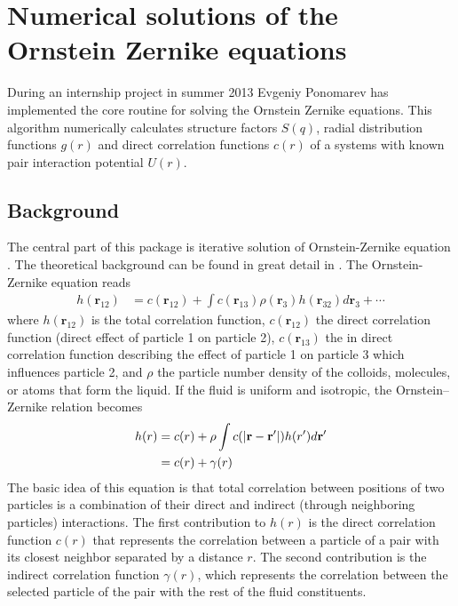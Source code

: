 \chapter{Numerical solutions of the Ornstein Zernike equations}

 During an internship project in summer 2013 Evgeniy
Ponomarev has implemented the core routine for solving the Ornstein
Zernike equations. This algorithm numerically calculates structure
factors $S(q)$, radial distribution functions $g(r)$ and direct
correlation functions $c(r)$ of a systems with known pair
interaction potential $U(r)$.
\section{Background}
The central part of this package is iterative solution of
Ornstein-Zernike equation \cite{Ornstein1914}. The theoretical background can be found
in great detail in \cite{Naegele2004,Henderson2000,Hansen2013,Bomont2008,Caccamo1996,Likos2001}.
The Ornstein-Zernike equation reads
\begin{align}\label{eq:oz_h12}
    h(\mathbf{r}_{12})&=c(\mathbf{r}_{12})+ \int c(\mathbf{r}_{13}) \rho(\mathbf{r}_3) h(\mathbf{r}_{32})
    d\mathbf{r}_3 + \cdots
\end{align}
where $h(\mathbf{r}_{12})$ is the total correlation function,
$c(\mathbf{r}_{12})$ the direct correlation function (direct effect
of particle 1 on particle 2), $c(\mathbf{r}_{13})$ the in direct
correlation function describing the effect of particle 1 on particle
3 which influences particle 2, and $\rho$ the particle number
density of the colloids, molecules, or atoms that form the liquid.
If the fluid is uniform and isotropic, the Ornstein–Zernike relation
becomes
\begin{align}\label{eq:ozh(r)}
    h(r)&=c(r)+ \rho \int c(\abs{\mathbf{r}-\mathbf{r}'})  h(r')
    d\mathbf{r}' \\
    &= c(r) + \gamma(r) \label{eq:ozgamma(r)}
\end{align}
The basic idea of this equation is that total correlation between
positions of two particles is a combination of their direct and
indirect (through neighboring particles) interactions. The first
contribution to $h(r)$ is the direct correlation function $c(r)$
that represents the correlation between a particle of a pair with
its closest neighbor separated by a distance $r$. The second
contribution is the indirect correlation function $\gamma(r)$, which
represents the correlation between the selected particle of the pair
with the rest of the fluid constituents.

